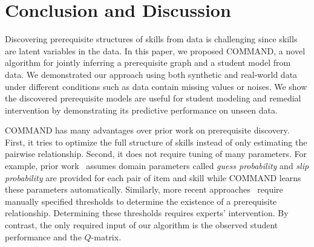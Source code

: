 \documentclass{edm_template}
\begin{document}
	\section{Conclusion and Discussion \label{sec:conclusion}}
	Discovering prerequisite structures of skills from data is challenging since skills are latent variables in the data.
	In this paper, we proposed COMMAND, a novel algorithm for jointly inferring a prerequisite graph and a student model from data.
	We demonstrated our approach using both synthetic and real-world data under different conditions such as data contain missing values or noises.
	We show the discovered prerequisite models are useful for student modeling and remedial intervention by demonstrating its predictive performance on unseen data.
	
	COMMAND has many advantages over prior work on prerequisite discovery. 
	First, it tries to optimize the full structure of skills instead of only estimating the pairwise relationship. 
	Second, it does not require tuning of many parameters.
	For example, prior work~\cite{brunskill2010estimating} assumes domain parameters called \emph{guess probability} and \emph{slip probability}
	are provided for each pair of item and skill while COMMAND learns these parameters automatically.
	Similarly, more recent approaches~\cite{chen2015discovering} require manually specified thresholds to determine the existence of a prerequisite relationship.
	Determining these thresholds requires experts' intervention. 
	By contrast, the only required input of our algorithm is the observed student performance and the $Q$-matrix.
	
	
\end{document}
